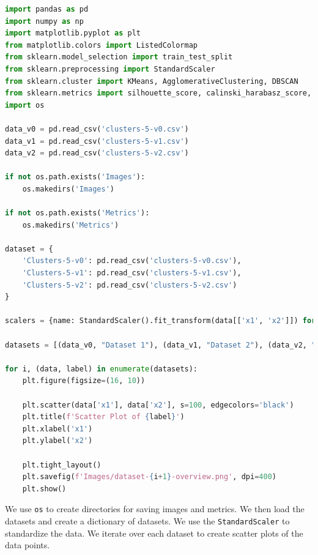 \begin{lstlisting}[language=Python, caption=Code to Generate Dataset Plots]
import pandas as pd
import numpy as np
import matplotlib.pyplot as plt
from matplotlib.colors import ListedColormap
from sklearn.model_selection import train_test_split
from sklearn.preprocessing import StandardScaler
from sklearn.cluster import KMeans, AgglomerativeClustering, DBSCAN
from sklearn.metrics import silhouette_score, calinski_harabasz_score, davies_bouldin_score, adjusted_rand_score, confusion_matrix
import os

data_v0 = pd.read_csv('clusters-5-v0.csv')
data_v1 = pd.read_csv('clusters-5-v1.csv')
data_v2 = pd.read_csv('clusters-5-v2.csv')

if not os.path.exists('Images'):
    os.makedirs('Images')

if not os.path.exists('Metrics'):
    os.makedirs('Metrics')

dataset = {
    'Clusters-5-v0': pd.read_csv('clusters-5-v0.csv'),
    'Clusters-5-v1': pd.read_csv('clusters-5-v1.csv'),
    'Clusters-5-v2': pd.read_csv('clusters-5-v2.csv')
}

scalers = {name: StandardScaler().fit_transform(data[['x1', 'x2']]) for name, data in dataset.items()}

datasets = [(data_v0, "Dataset 1"), (data_v1, "Dataset 2"), (data_v2, "Dataset 3")]

for i, (data, label) in enumerate(datasets):
    plt.figure(figsize=(16, 10))
    
    plt.scatter(data['x1'], data['x2'], s=100, edgecolors='black')
    plt.title(f'Scatter Plot of {label}')
    plt.xlabel('x1')
    plt.ylabel('x2')
    
    plt.tight_layout()
    plt.savefig(f'Images/dataset-{i+1}-overview.png', dpi=400)
    plt.show()
\end{lstlisting}

\begin{remark*}
	We use \texttt{os} to create directories for saving images and metrics. We then load the datasets and create a dictionary of datasets. We use the \texttt{StandardScaler} to standardize the data. We iterate over each dataset to create scatter plots of the data points.
\end{remark*}

\clearpage